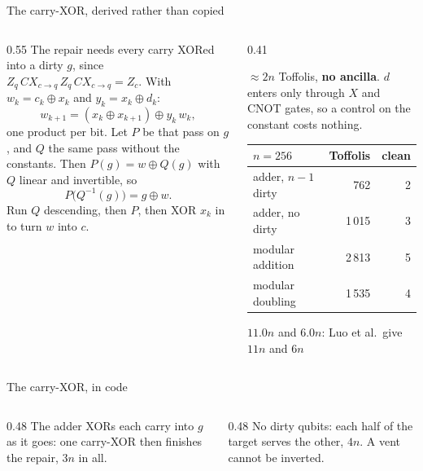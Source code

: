 \documentclass[aspectratio=169,11pt]{beamer}
\newcommand{\code}[2][]{}
\begin{document}
\setcounter{framenumber}{194}
\begin{frame}{The carry-XOR, derived rather than copied}
  \begin{columns}[T]
    \begin{column}{0.55\textwidth}
      \small The repair needs every carry XORed into a dirty $g$, since $Z_q\,CX_{c\to q}\,Z_q\,CX_{c\to q}=Z_c$. With $w_k=c_k\oplus x_k$ and $y_k=x_k\oplus d_k$:
      \[ w_{k+1}=(x_k\oplus x_{k+1})\oplus y_k\,w_k , \]
      one product per bit. Let $P$ be that pass on $g$, and $Q$ the same pass without the constants. Then $P(g)=w\oplus Q(g)$ with $Q$ linear and invertible, so
      \[ P\big(Q^{-1}(g)\big)=g\oplus w . \]
      Run $Q$ descending, then $P$, then XOR $x_k$ in to turn $w$ into $c$.
    \end{column}
    \begin{column}{0.41\textwidth}
      \begin{greyblock}[fontupper=\small]
        $\approx2n$ Toffolis, \textbf{no ancilla}. $d$ enters only through $X$ and CNOT gates, so a control on the constant costs nothing.
      \end{greyblock}
      \vskip1mm
      \centering\footnotesize
      \renewcommand{\arraystretch}{1.08}
      \begin{tabular}{@{}lrr@{}}
        \toprule
        $n=256$ & Toffolis & clean \\
        \midrule
        adder, $n-1$ dirty & 762 & 2 \\
        adder, no dirty & 1\,015 & 3 \\
        modular addition & 2\,813 & 5 \\
        modular doubling & 1\,535 & 4 \\
        \bottomrule
      \end{tabular}\par
      {\scriptsize $11.0n$ and $6.0n$: Luo et al.\ give $11n$ and $6n$}
    \end{column}
  \end{columns}
\end{frame}

\setcounter{framenumber}{195}
\begin{frame}[fragile]{The carry-XOR, in code}
  \code[basicstyle=\ttfamily\scriptsize]{carry_xor.py}
  \vskip1mm
  \begin{columns}[T]
    \begin{column}{0.48\textwidth}
      {\small The adder XORs each carry into $g$ as it goes: one carry-XOR then finishes the repair, $3n$ in all.}
    \end{column}
    \begin{column}{0.48\textwidth}
      {\small No dirty qubits: each half of the target serves the other, $4n$. A vent cannot be inverted.}
    \end{column}
  \end{columns}
\end{frame}
\end{document}
